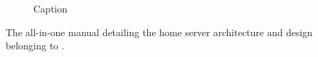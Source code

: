 \thispagestyle{empty}


\begin{center}

    \vspace{6cm}
    {\huge \bf \manualname }

    \authorname
    \vfill

    \begin{figure}[h]
        \centering
        
        \caption{Caption}
        \label{fig:placeholder}
    \end{figure}

    \vfill
    The all-in-one manual detailing the home server architecture and design belonging to \authorname.

    \vfill
    
\end{center}